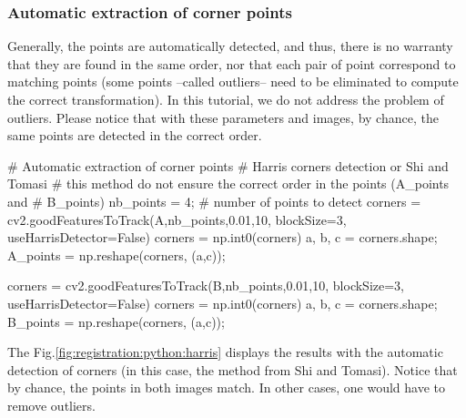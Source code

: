 \subsubsection{Automatic extraction of corner points}
Generally, the points are automatically detected, and thus, there is no warranty that they are found in the same order, nor that each pair of point correspond to matching points (some points --called outliers-- need to be eliminated to compute the correct transformation). In this tutorial, we do not address the problem of outliers. Please notice that with these parameters and images, by chance, the same points are detected in the correct order.

\begin{python}
# Automatic extraction of corner points
# Harris corners detection or Shi and Tomasi
# this method do not ensure the correct order in the points (A_points and 
# B_points)
nb_points = 4; # number of points to detect
corners = cv2.goodFeaturesToTrack(A,nb_points,0.01,10, blockSize=3, useHarrisDetector=False)
corners = np.int0(corners)
a, b, c = corners.shape;
A_points = np.reshape(corners, (a,c));

corners = cv2.goodFeaturesToTrack(B,nb_points,0.01,10, blockSize=3, useHarrisDetector=False)
corners = np.int0(corners)
a, b, c = corners.shape;
B_points = np.reshape(corners, (a,c));
\end{python}



The Fig.\ref{fig:registration:python:harris} displays the results with the automatic detection of corners (in this case, the method from Shi and Tomasi). Notice that by chance, the points in both images match. In other cases, one would have to remove outliers.

